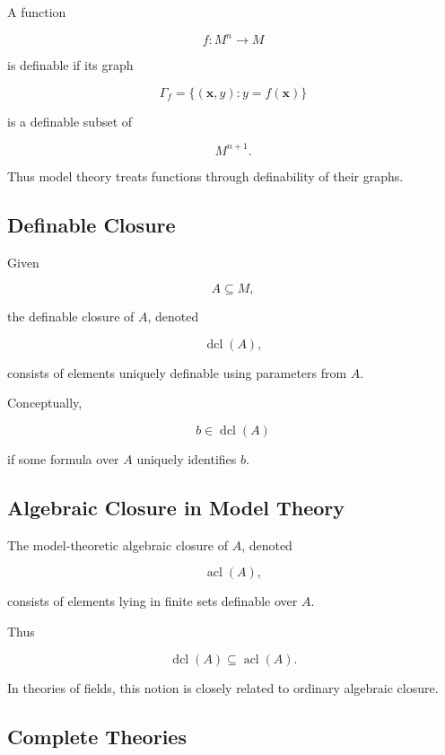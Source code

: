 A function

\[
f:M^n\to M
\]

is definable if its graph

\[
\boxed{
\Gamma_f
=
\{
(\mathbf{x},y):
y=f(\mathbf{x})
\}
}
\]

is a definable subset of

\[
M^{n+1}.
\]

Thus model theory treats functions through definability of their graphs.

\subsection{Definable Closure}
\label{subsec:definable-closure}

Given

\[
A\subseteq M,
\]

the definable closure of \(A\), denoted

\[
\boxed{
\operatorname{dcl}(A),
}
\]

consists of elements uniquely definable using parameters from \(A\).

Conceptually,

\[
b\in\operatorname{dcl}(A)
\]

if some formula over \(A\) uniquely identifies \(b\).

\subsection{Algebraic Closure in Model Theory}
\label{subsec:model-theoretic-algebraic-closure}

The model-theoretic algebraic closure of \(A\), denoted

\[
\boxed{
\operatorname{acl}(A),
}
\]

consists of elements lying in finite sets definable over \(A\).

Thus

\[
\boxed{
\operatorname{dcl}(A)
\subseteq
\operatorname{acl}(A).
}
\]

In theories of fields, this notion is closely related to ordinary algebraic
closure.

\subsection{Complete Theories}
\label{subsec:complete-theories-model-theory}

